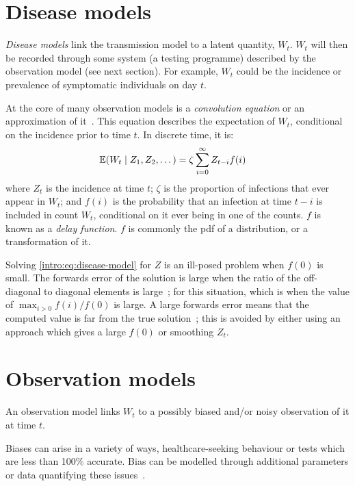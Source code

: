 \documentclass[thesis.tex]{subfiles}
\begin{document}
\section{Disease models} \label{intro:sec:disease-model}

\emph{Disease models} link the transmission model to a latent quantity, $W_t$.
$W_t$ will then be recorded through some system (\eg a testing programme) described by the observation model (see next section).
For example, $W_t$ could be the incidence or prevalence of symptomatic individuals on day $t$.

At the core of many observation models is a \emph{convolution equation} or an approximation of it~\autocite[e.g.][]{brookmeyerBackcalculation,abbottEstimating,birrellRealtimea}.
This equation describes the expectation of $W_t$, conditional on the incidence prior to time $t$.
In discrete time, it is:
\begin{align}
    \operatorname{\mathbb{E}}(W_t \mid Z_1, Z_2, \dots) &= \zeta \sum_{i=0}^\infty Z_{t-i} f(i)
    \label{intro:eq:disease-model}
\end{align}
where $Z_t$ is the incidence at time $t$; $\zeta$ is the proportion of infections that ever appear in $W_t$; and $f(i)$ is the probability that an infection at time $t-i$ is included in count $W_t$, conditional on it ever being in one of the counts.
$f$ is known as a \emph{delay function}.
$f$ is commonly the pdf of a distribution, or a transformation of it.

Solving \cref{intro:eq:disease-model} for $Z$ is an ill-posed problem when $f(0)$ is small.
The forwards error of the solution is large when the ratio of the off-diagonal to diagonal elements is large~\autocite[chapter 8.2]{highamAccuracy}; for this situation, which is when the value of $\max_{i > 0} f(i) / f(0)$ is large.
A large forwards error means that the computed value is far from the true solution~\autocite[6--9]{highamAccuracy}; this is avoided by either using an approach which gives a large $f(0)$ or smoothing $Z_t$.

\section{Observation models}

An observation model links $W_t$ to a possibly biased and/or noisy observation of it at time $t$.

Biases can arise in a variety of ways, \eg healthcare-seeking behaviour or tests which are less than 100\% accurate.
Bias can be modelled through additional parameters or data quantifying these issues~\autocite[e.g.][]{sherrattExploring,birrellRealtimea,nicholsonImproving,swallow2022challenges}.
\end{document}
